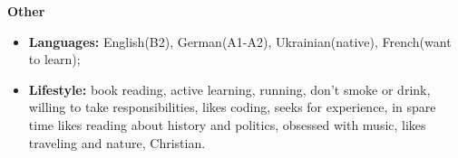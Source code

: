 {
    {\vspace{0.5cm} \hspace{-0.5cm} \Large \textbf{Other}}

    \begin{itemize}
        \item \textbf{Languages:} English(B2), German(A1-A2), Ukrainian(native), French(want to learn);
        \item \textbf{Lifestyle:}
            book reading,
            active learning,
            running,
            don't smoke or drink,
            willing to take responsibilities,
            likes coding,
            seeks for experience,
            in spare time likes reading about history and politics,
            obsessed with music,
            likes traveling and nature,
            Christian.
            
    \end{itemize}
}